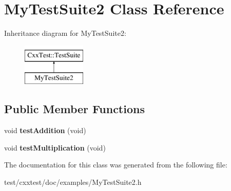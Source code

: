 \hypertarget{classMyTestSuite2}{\section{My\-Test\-Suite2 Class Reference}
\label{classMyTestSuite2}
}
Inheritance diagram for My\-Test\-Suite2\-:\begin{figure}[H]
\begin{center}
\leavevmode
\includegraphics[height=2.000000cm]{classMyTestSuite2}
\end{center}
\end{figure}
\subsection*{Public Member Functions}
\begin{DoxyCompactItemize}
\item 
\hypertarget{classMyTestSuite2_a0f9b11d358eeb0e78e3d2f1b40c8035f}{void {\bfseries test\-Addition} (void)}\label{classMyTestSuite2_a0f9b11d358eeb0e78e3d2f1b40c8035f}

\item 
\hypertarget{classMyTestSuite2_aedefb7da7a9f8e881af384c9389c60bd}{void {\bfseries test\-Multiplication} (void)}\label{classMyTestSuite2_aedefb7da7a9f8e881af384c9389c60bd}

\end{DoxyCompactItemize}


The documentation for this class was generated from the following file\-:\begin{DoxyCompactItemize}
\item 
test/cxxtest/doc/examples/My\-Test\-Suite2.\-h\end{DoxyCompactItemize}
